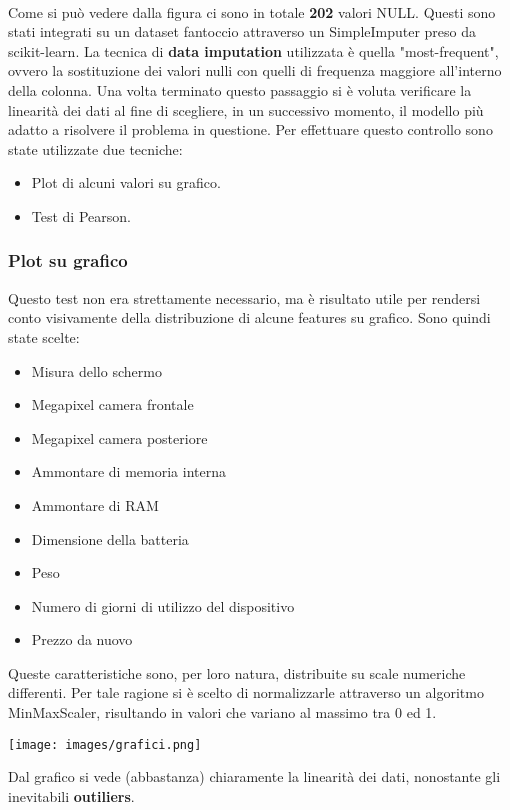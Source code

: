 \documentclass{article}
\begin{document}
    \newline\\
    Come si può vedere dalla figura ci sono in totale \textbf{202} valori NULL. Questi sono stati integrati su un dataset fantoccio attraverso un SimpleImputer preso da scikit-learn. La tecnica di \textbf{data imputation} utilizzata è quella "most-frequent", ovvero la sostituzione dei valori nulli con quelli di frequenza maggiore all'interno della colonna.\newline
    Una volta terminato questo passaggio si è voluta verificare la linearità dei dati al fine di scegliere, in un successivo momento, il modello più adatto a risolvere il problema in questione. Per effettuare questo controllo sono state utilizzate due tecniche:
    \begin{itemize}
        \item Plot di alcuni valori su grafico.
        \item Test di Pearson.
    \end{itemize}
    \newpage
    \subsubsection{Plot su grafico}\newline
    Questo test non era strettamente necessario, ma è risultato utile per rendersi conto visivamente della distribuzione di alcune features su grafico.
    Sono quindi state scelte:
    \begin{itemize}
        \item Misura dello schermo
        \item Megapixel camera frontale
        \item Megapixel camera posteriore
        \item Ammontare di memoria interna
        \item Ammontare di RAM
        \item Dimensione della batteria
        \item Peso
        \item Numero di giorni di utilizzo del dispositivo
        \item Prezzo da nuovo 
    \end{itemize}\newline
    Queste caratteristiche sono, per loro natura, distribuite su scale numeriche differenti. Per tale ragione si è scelto di normalizzarle attraverso un algoritmo MinMaxScaler, risultando in valori che variano al massimo tra 0 ed 1.\newline\\
    \begin{center}
        \texttt{[image: images/grafici.png]}
    \end{center}
    \newline
    Dal grafico si vede (abbastanza) chiaramente la linearità dei dati, nonostante gli inevitabili \textbf{outiliers}.
    \newpage
\end{document}
